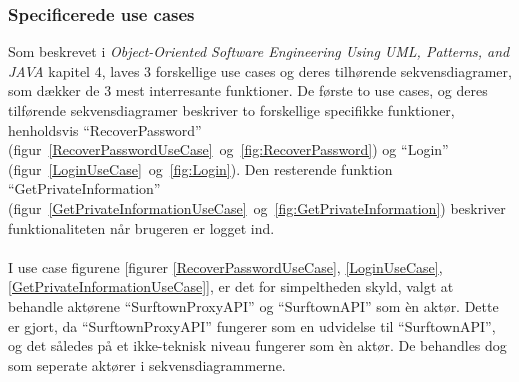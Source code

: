 \documentclass[12pt]{article}
\begin{document}
\subsubsection*{Specificerede use cases}
Som beskrevet i \emph{Object-Oriented Software Engineering Using UML, Patterns, and JAVA}\cite{OOSE} kapitel 4, laves 3 forskellige use cases og deres tilhørende sekvensdiagramer, som dækker de 3 mest interresante funktioner. De første to use cases, og deres tilførende sekvensdiagramer beskriver to forskellige specifikke funktioner, henholdsvis ``RecoverPassword'' (figur~\ref{RecoverPasswordUseCase}~og~\ref{fig:RecoverPassword}) og ``Login'' (figur~\ref{LoginUseCase}~og~\ref{fig:Login}). Den resterende funktion ``GetPrivateInformation'' (figur~\ref{GetPrivateInformationUseCase}~og~\ref{fig:GetPrivateInformation}) beskriver funktionaliteten når brugeren er logget ind.\\\\
I use case figurene [figurer \ref{RecoverPasswordUseCase}, \ref{LoginUseCase}, \ref{GetPrivateInformationUseCase}], er det for simpeltheden skyld, valgt at behandle aktørene ``SurftownProxyAPI'' og ``SurftownAPI'' som èn aktør. Dette er gjort, da ``SurftownProxyAPI'' fungerer som en udvidelse til ``SurftownAPI'', og det således på et ikke-teknisk niveau fungerer som èn aktør. De behandles dog som seperate aktører i sekvensdiagrammerne.
\end{document}
